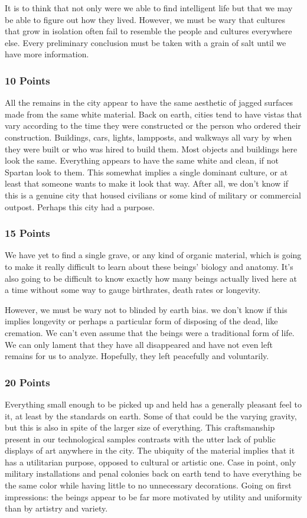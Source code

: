 \documentclass[conference]{IEEEtran}
\begin{document}
It is to think that not only were we able to find intelligent life but that we may be able to figure out how they lived. However, we must be wary that cultures that grow in isolation often fail to resemble the people and cultures everywhere else. Every preliminary conclusion must be taken with a grain of salt until we have more information. 

\subsubsection*{10 Points}
All the remains in the city appear to have the same aesthetic of jagged surfaces made from the same white material. Back on earth, cities tend to have vistas that vary according to the time they were constructed or the person who ordered their construction. Buildings, cars, lights, lampposts, and walkways all vary by when they were built or who was hired to build them. Most objects and buildings here look the same. Everything appears to have the same white and clean, if not Spartan look to them. This somewhat implies a single dominant culture, or at least that someone wants to make it look that way. After all, we don’t know if this is a genuine city that housed civilians or some kind of military or commercial outpost.  Perhaps this city had a purpose.

\subsubsection*{15 Points}
We have yet to find a single grave, or any kind of organic material, which is going to make it really difficult to learn about these beings’ biology and anatomy. It’s also going to be difficult to know exactly how many beings actually lived here at a time without some way to gauge birthrates, death rates or longevity. 

However, we must be wary not to blinded by earth bias. we don’t know if this implies longevity or perhaps a particular form of disposing of the dead, like cremation. We can’t even assume that the beings were a traditional form of life. We can only lament that they have all disappeared and have not even left remains for us to analyze. Hopefully, they left peacefully and voluntarily. 

\subsubsection*{20 Points}
Everything small enough to be picked up and held has a generally pleasant feel to it, at least by the standards on earth. Some of that could be the varying gravity, but this is also in spite of the larger size of everything. This craftsmanship present in our technological samples contrasts with the utter lack of public displays of art anywhere in the city. The ubiquity of the material implies that it has a utilitarian purpose, opposed to cultural or artistic one. Case in point, only military installations and penal colonies back on earth tend to have everything be the same color while having little to no unnecessary decorations. Going on first impressions: the beings appear to be far more motivated by utility and uniformity than by artistry and variety.
\end{document}
